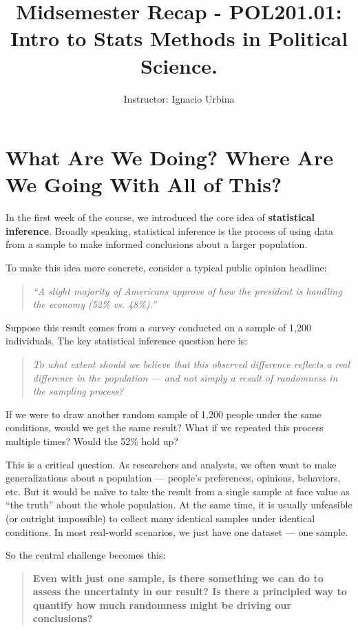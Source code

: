 \documentclass[12pt]{article}
\title{Midsemester Recap - POL201.01: Intro to Stats Methods in Political Science.}
\author{Instructor: Ignacio Urbina}
\date{}
\begin{document}
\maketitle
\vspace{-3em}

\section*{What Are We Doing? Where Are We Going With All of This?}

In the first week of the course, we introduced the core idea of \textbf{statistical inference}. Broadly speaking, statistical inference is the process of using data from a sample to make informed conclusions about a larger population. 

To make this idea more concrete, consider a typical public opinion headline: 

\begin{quote}
    \textit{``A slight majority of Americans approve of how the president is handling the economy (52\% vs. 48\%).''}
\end{quote}

Suppose this result comes from a survey conducted on a sample of 1,200 individuals. The key statistical inference question here is: 

\begin{quote}
    \textit{To what extent should we believe that this observed difference reflects a real difference in the population — and not simply a result of randomness in the sampling process?}
\end{quote}

If we were to draw another random sample of 1,200 people under the same conditions, would we get the same result? What if we repeated this process multiple times? Would the 52\% hold up?

\vspace{0.5em}
This is a critical question. As researchers and analysts, we often want to make generalizations about a population — people's preferences, opinions, behaviors, etc. But it would be naïve to take the result from a single sample at face value as ``the truth'' about the whole population. At the same time, it is usually unfeasible (or outright impossible) to collect many identical samples under identical conditions. In most real-world scenarios, we just have one dataset — one sample.

So the central challenge becomes this:

\begin{quote}
    \textbf{Even with just one sample, is there something we can do to assess the uncertainty in our result? Is there a principled way to quantify how much randomness might be driving our conclusions?}
\end{quote}
\end{document}
